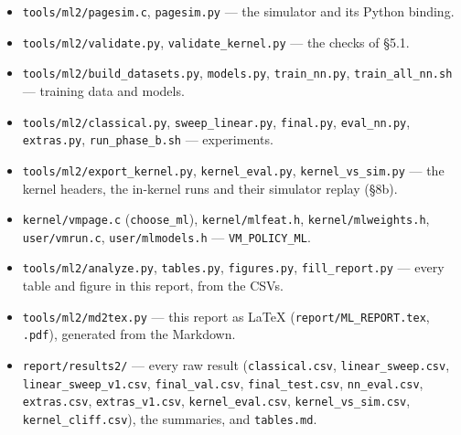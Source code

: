\documentclass[10pt,a4paper]{article}
\newcommand{\code}[1]{\texttt{#1}}
\begin{document}
\begin{itemize}
\item \code{tools/\allowbreak{}ml2/\allowbreak{}pagesim.\allowbreak{}c}, \code{pagesim.\allowbreak{}py} — the simulator and its Python binding.
\item \code{tools/\allowbreak{}ml2/\allowbreak{}validate.\allowbreak{}py}, \code{validate\_\allowbreak{}kernel.\allowbreak{}py} — the checks of §5.1.
\item \code{tools/\allowbreak{}ml2/\allowbreak{}build\_\allowbreak{}datasets.\allowbreak{}py}, \code{models.\allowbreak{}py}, \code{train\_\allowbreak{}nn.\allowbreak{}py}, \code{train\_\allowbreak{}all\_\allowbreak{}nn.\allowbreak{}sh} — training data and models.
\item \code{tools/\allowbreak{}ml2/\allowbreak{}classical.\allowbreak{}py}, \code{sweep\_\allowbreak{}linear.\allowbreak{}py}, \code{final.\allowbreak{}py}, \code{eval\_\allowbreak{}nn.\allowbreak{}py}, \code{extras.\allowbreak{}py}, \code{run\_\allowbreak{}phase\_\allowbreak{}b.\allowbreak{}sh} — experiments.
\item \code{tools/\allowbreak{}ml2/\allowbreak{}export\_\allowbreak{}kernel.\allowbreak{}py}, \code{kernel\_\allowbreak{}eval.\allowbreak{}py}, \code{kernel\_\allowbreak{}vs\_\allowbreak{}sim.\allowbreak{}py} — the kernel headers, the in-kernel runs and their simulator replay (§8b).
\item \code{kernel/\allowbreak{}vmpage.\allowbreak{}c} (\code{choose\_\allowbreak{}ml}), \code{kernel/\allowbreak{}mlfeat.\allowbreak{}h}, \code{kernel/\allowbreak{}mlweights.\allowbreak{}h}, \code{user/\allowbreak{}vmrun.\allowbreak{}c}, \code{user/\allowbreak{}mlmodels.\allowbreak{}h} — \code{VM\_\allowbreak{}POLICY\_\allowbreak{}ML}.
\item \code{tools/\allowbreak{}ml2/\allowbreak{}analyze.\allowbreak{}py}, \code{tables.\allowbreak{}py}, \code{figures.\allowbreak{}py}, \code{fill\_\allowbreak{}report.\allowbreak{}py} — every table and figure in this report, from the CSVs.
\item \code{tools/\allowbreak{}ml2/\allowbreak{}md2tex.\allowbreak{}py} — this report as LaTeX (\code{report/\allowbreak{}ML\_\allowbreak{}REPORT.\allowbreak{}tex}, \code{.\allowbreak{}pdf}), generated from the Markdown.
\item \code{report/\allowbreak{}results2/\allowbreak{}} — every raw result (\code{classical.\allowbreak{}csv}, \code{linear\_\allowbreak{}sweep.\allowbreak{}csv}, \code{linear\_\allowbreak{}sweep\_\allowbreak{}v1.\allowbreak{}csv}, \code{final\_\allowbreak{}val.\allowbreak{}csv}, \code{final\_\allowbreak{}test.\allowbreak{}csv}, \code{nn\_\allowbreak{}eval.\allowbreak{}csv}, \code{extras.\allowbreak{}csv}, \code{extras\_\allowbreak{}v1.\allowbreak{}csv}, \code{kernel\_\allowbreak{}eval.\allowbreak{}csv}, \code{kernel\_\allowbreak{}vs\_\allowbreak{}sim.\allowbreak{}csv}, \code{kernel\_\allowbreak{}cliff.\allowbreak{}csv}), the summaries, and \code{tables.\allowbreak{}md}.

\end{itemize}
\end{document}
